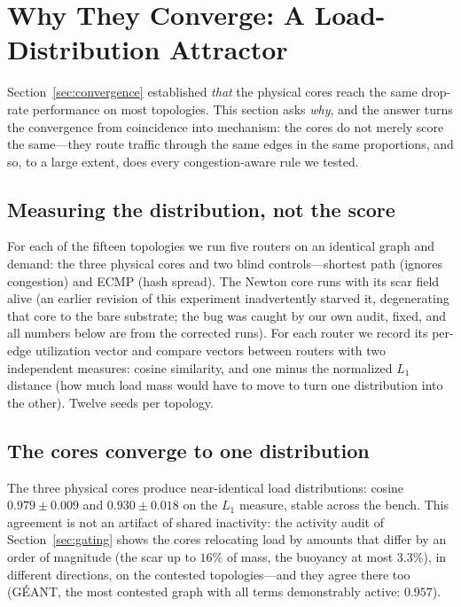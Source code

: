 \section{Why They Converge: A Load-Distribution Attractor}
\label{sec:attractor}

Section~\ref{sec:convergence} established \emph{that} the physical cores reach
the same drop-rate performance on most topologies. This section asks
\emph{why}, and the answer turns the convergence from coincidence into
mechanism: the cores do not merely score the same---they route traffic through
the same edges in the same proportions, and so, to a large extent, does every
congestion-aware rule we tested.

\subsection{Measuring the distribution, not the score}

For each of the fifteen topologies we run five routers on an identical graph
and demand: the three physical cores and two blind controls---shortest path
(ignores congestion) and ECMP (hash spread). The Newton core runs with its
scar field alive (an earlier revision of this experiment inadvertently starved
it, degenerating that core to the bare substrate; the bug was caught by our
own audit, fixed, and all numbers below are from the corrected runs). For each
router we record its per-edge utilization vector and compare vectors between
routers with two independent measures: cosine similarity, and one minus the
normalized $L_1$ distance (how much load mass would have to move to turn one
distribution into the other). Twelve seeds per topology.

\subsection{The cores converge to one distribution}

The three physical cores produce near-identical load distributions: cosine
$0.979 \pm 0.009$ and $0.930 \pm 0.018$ on the $L_1$ measure, stable across
the bench. This agreement is not an artifact of shared inactivity: the
activity audit of Section~\ref{sec:gating} shows the cores relocating load by
amounts that differ by an order of magnitude (the scar up to $16\%$ of mass,
the buoyancy at most $3.3\%$), in different directions, on the contested
topologies---and they agree there too (G\'EANT, the most contested graph with
all terms demonstrably active: $0.957$).

